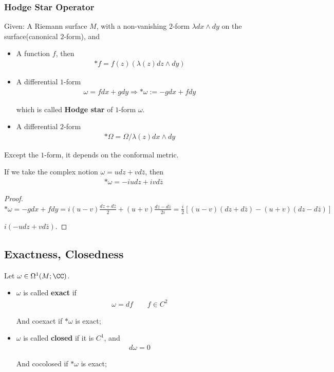 \documentclass[Total.tex]{subfiles}
\begin{document}
	\subsubsection{Hodge Star Operator}
	\begin{Def}Given: A Riemann surface $M$, with a non-vanishing $2$-form $\lambda dx\wedge dy$ on the surface(canonical $2$-form), and
		\begin{itemize}
			\item  A function $f$, then
			\begin{gather*}
				*f=f(z)(\lambda(z)dz\wedge dy)
			\end{gather*}
			\item 
			 A differential $1$-form
			\begin{gather*}
				\omega=fdx+gdy\Rightarrow *\omega:=-gdx+fdy
			\end{gather*}
			
			which is called \textbf{Hodge star} of $1$-form $\omega$. 
			\item A differential $2$-form
			\begin{gather*}
				*\Omega=\Omega/\lambda(z)dx\wedge dy
			\end{gather*}
		\end{itemize}
	\end{Def}
	
	Except the $1$-form, it depends on the conformal metric. 
	
	\begin{proposition}
		If we take the complex notion $\omega=udz+vd\bar{z}$, then
		\begin{gather*}
			*\omega=-iudz+ivd\bar{z}
		\end{gather*}
	\end{proposition}
	\begin{proof}
		$*\omega=-gdx+fdy=i(u-v)\frac{dz+d\bar{z}}{2}+(u+v)\frac{dz-d\bar{z}}{2i}=\frac{i}{2}[(u-v)(dz+d\bar{z})-(u+v)(dz-d\bar{z})]$
		
		$i(-udz+vd\bar{z})$.
	\end{proof}
	\subsection{Exactness, Closedness}
		\begin{Def}
			Let $\omega\in \Omega^1(M;\CC)$.
			
			\begin{itemize}
				\item $\omega$ is called \textbf{exact} if
				\begin{gather*}
					\omega=df\qquad f\in C^2
				\end{gather*}
				
				And coexact if $*\omega$ is exact;
				\item $\omega$ is called \textbf{closed} if it is $C^1$, and 
				\begin{gather*}
					d\omega=0
				\end{gather*}
				
				And cocolosed if $*\omega$ is exact;
			\end{itemize}
		\end{Def}
		
\end{document}
